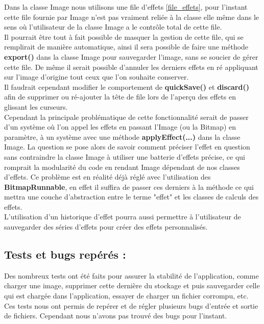 Dans la classe Image nous utilisons une file d'effets \ref{file_effets}, pour l'instant cette file fournie par Image n'est pas vraiment reliée à la classe elle même dans le sens où l'utilisateur de la classe Image a le contrôle total de cette file.
\\
Il pourrait être tout à fait possible de masquer la gestion de cette file, qui se remplirait de manière automatique, ainsi il sera possible de faire une méthode \textbf{export()} dans la classe Image pour sauvegarder l'image, sans se soucier de gérer cette file. De même il serait possible d'annuler les derniers effets en ré appliquant sur l'image d'origine tout ceux que l'on souhaite conserver.
\\
Il faudrait cependant modifier le comportement de \textbf{quickSave()} et \textbf{discard()} afin de supprimer ou ré-ajouter la tête de file lors de l'aperçu des effets en glissant les curseurs.
\\
Cependant la principale problématique de cette fonctionnalité serait de passer d'un système où l'on appel les effets en passant l'Image (ou la Bitmap) en paramètre, à un système avec une méthode \textbf{applyEffect(...)} dans la classe Image. La question se pose alors de savoir comment préciser l'effet en question sans contraindre la classe Image à utiliser une batterie d'effets précise, ce qui romprait la modularité du code en rendant Image dépendant de nos classes d'effets. Ce problème est en réalité déjà réglé avec l'utilisation des \textbf{BitmapRunnable}, en effet il suffira de passer ces derniers à la méthode ce qui mettra une couche d'abstraction entre le terme "effet" et les classes de calculs des effets.
\\

L'utilisation d'un historique d'effet pourra aussi permettre à l'utilisateur de sauvegarder des séries d'effets pour créer des effets personnalisés.

\subsection{Tests et bugs repérés :}
Des nombreux tests ont été faits pour assurer la stabilité de l'application, comme charger une image, supprimer cette dernière du stockage et puis sauvegarder celle qui est chargée dans l'application, essayer de charger un fichier corrompu, etc. Ces tests nous ont permis de repérer et de régler plusieurs bugs d'entrée et sortie de fichiers. Cependant nous n'avons pas trouvé des bugs pour l'instant.

